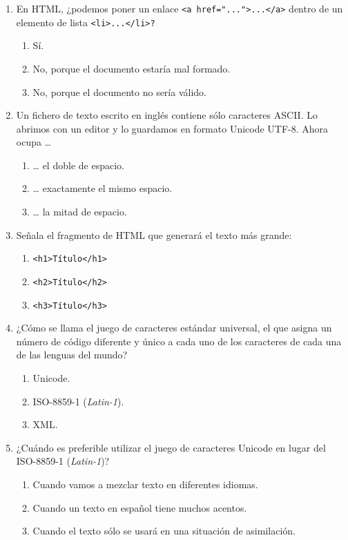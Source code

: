 {\begin{enumerate}
\item En HTML, ¿podemos poner un enlace \texttt{<a href="..."}\texttt{>...</a>} dentro de un elemento de lista \texttt{<li>...</li>?} \begin{enumerate} \item Sí. \item No, porque el documento estaría mal formado. \item No, porque el documento no sería válido. \end{enumerate} 

\item Un fichero de texto escrito en inglés contiene sólo caracteres ASCII. Lo abrimos con un editor y lo guardamos en formato Unicode UTF-8. Ahora ocupa {\ldots} \begin{enumerate} \item {\ldots} el doble de espacio. \item {\ldots} exactamente el mismo espacio. \item {\ldots} la mitad de espacio. \end{enumerate} 

\item Señala el fragmento de HTML que generará el texto más grande: \begin{enumerate} \item \texttt{<h1>Título</h1>} \item \texttt{<h2>Título</h2>} \item \texttt{<h3>Título</h3>} \end{enumerate} 

\item ¿Cómo se llama el juego de caracteres estándar universal, el que asigna un número de código diferente y único a cada uno de los caracteres de cada una de las lenguas del mundo? \begin{enumerate} \item Unicode. \item ISO-8859-1 (\emph{Latin-1}). \item XML. \end{enumerate} 

\item ¿Cuándo es preferible utilizar el juego de caracteres Unicode en lugar del ISO-8859-1 (\emph{Latin-1})? \begin{enumerate} \item Cuando vamos a mezclar texto en diferentes idiomas. \item Cuando un texto en español tiene muchos acentos. \item Cuando el texto sólo se usará en una situación de asimilación. \end{enumerate} 


\end{enumerate}}
